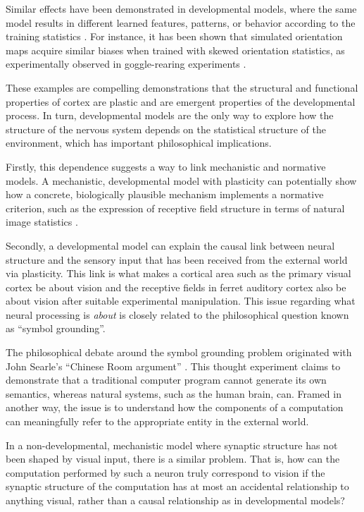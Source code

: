 \documentclass[phd,ianc,twoside]{infthesis}
\begin{document}
Similar effects have been demonstrated in developmental models, where
the same model results in different learned features, patterns, or
behavior according to the training statistics
\citep{bednar_jpp12,miikkulainen_2005}. For instance, it has been shown
that simulated orientation maps acquire similar biases when trained
with skewed orientation statistics, as experimentally observed in
goggle-rearing experiments \citep{stevens_jn13,tanaka_plosone09}.

These examples are compelling demonstrations that the structural and
functional properties of cortex are plastic and are emergent properties
of the developmental process. In turn, developmental models are the only
way to explore how the structure of the nervous system depends on the
statistical structure of the environment, which has important
philosophical implications.

Firstly, this dependence suggests a way to link mechanistic and normative models. A
mechanistic, developmental model with plasticity can potentially show
how a concrete, biologically plausible mechanism implements a normative
criterion, such as the expression of receptive field structure in terms
of natural image statistics \citep{hyvrinen_book09}.

Secondly, a developmental model can explain the causal link between
neural structure and the sensory input that has been received from the
external world via plasticity. This link is what makes a cortical area such
as the primary visual cortex be about vision and the receptive fields in
ferret auditory cortex also be about vision after suitable experimental
manipulation. This issue regarding what neural processing is
\emph{about} is closely related to the philosophical question known as
``symbol grounding''.

The philosophical debate around the symbol grounding problem originated
with John Searle's ``Chinese Room argument'' \citep{searle_bbs80}. This
thought experiment claims to demonstrate that a traditional computer
program cannot generate its own semantics, whereas natural systems, such
as the human brain, can. Framed in another way, the issue is to
understand how the components of a computation can meaningfully refer to the
appropriate entity in the external world.

In a non-developmental, mechanistic model where synaptic structure has
not been shaped by visual input, there is a similar problem.  That is, how
can the computation performed by such a neuron truly correspond to vision if
the synaptic structure of the computation has at most an accidental
relationship to anything visual, rather than a causal relationship
as in developmental models?
\end{document}
